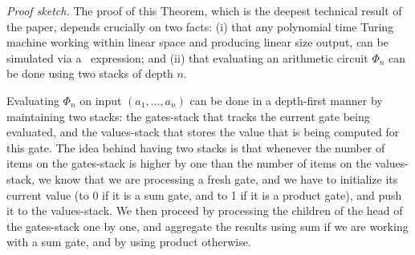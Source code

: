 %
%

\textit{Proof sketch.} The proof of this Theorem, which is the deepest technical result of the paper, depends crucially on two facts: (i) that any polynomial time Turing machine working within linear space and producing linear size output, can be simulated via a \langfor\ expression; and (ii) that evaluating an arithmetic circuit $\Phi_n$ can be done using two stacks of  depth $n$.

Evaluating  $\Phi_n$ on input $(a_1,\ldots ,a_n)$ can be done in a depth-first manner by maintaining  two stacks: the gates-stack that tracks the current gate being evaluated, and the values-stack that stores the value that is being computed for this gate. The idea behind having two stacks is that whenever the number of items on the gates-stack is higher by one than the number of items on the values-stack, we know that we are processing a fresh gate, and we have to initialize its current value (to 0 if it is a sum gate, and to 1 if it is a product gate), and push it to the values-stack. We then proceed by processing the children of the head of the gates-stack one by one, and aggregate the results using sum if we are working with a sum gate, and by using product otherwise. 

